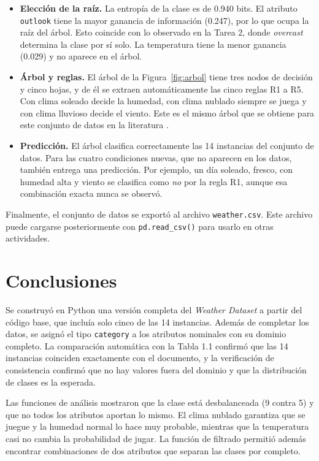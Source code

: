 \documentclass[11pt,letterpaper]{article}
\begin{document}
\begin{itemize}
    \item \textbf{Elección de la raíz.} La entropía de la clase es de 0.940 bits. El atributo \texttt{outlook} tiene la mayor ganancia de información (0.247), por lo que ocupa la raíz del árbol. Esto coincide con lo observado en la Tarea 2, donde \textit{overcast} determina la clase por sí solo. La temperatura tiene la menor ganancia (0.029) y no aparece en el árbol.
    \item \textbf{Árbol y reglas.} El árbol de la Figura~\ref{fig:arbol} tiene tres nodos de decisión y cinco hojas, y de él se extraen automáticamente las cinco reglas R1 a R5. Con clima soleado decide la humedad, con clima nublado siempre se juega y con clima lluvioso decide el viento. Este es el mismo árbol que se obtiene para este conjunto de datos en la literatura \parencite{witten2017,quinlan1986}.
    \item \textbf{Predicción.} El árbol clasifica correctamente las 14 instancias del conjunto de datos. Para las cuatro condiciones nuevas, que no aparecen en los datos, también entrega una predicción. Por ejemplo, un día soleado, fresco, con humedad alta y viento se clasifica como \textit{no} por la regla R1, aunque esa combinación exacta nunca se observó.
\end{itemize}

Finalmente, el conjunto de datos se exportó al archivo \texttt{weather.csv}. Este archivo puede cargarse posteriormente con \texttt{pd.read\_csv()} para usarlo en otras actividades.

\section{Conclusiones}

Se construyó en Python una versión completa del \textit{Weather Dataset} a partir del código base, que incluía solo cinco de las 14 instancias. Además de completar los datos, se asignó el tipo \texttt{category} a los atributos nominales con su dominio completo. La comparación automática con la Tabla 1.1 confirmó que las 14 instancias coinciden exactamente con el documento, y la verificación de consistencia confirmó que no hay valores fuera del dominio y que la distribución de clases es la esperada.

Las funciones de análisis mostraron que la clase está desbalanceada (9 contra 5) y que no todos los atributos aportan lo mismo. El clima nublado garantiza que se juegue y la humedad normal lo hace muy probable, mientras que la temperatura casi no cambia la probabilidad de jugar. La función de filtrado permitió además encontrar combinaciones de dos atributos que separan las clases por completo.
\end{document}
